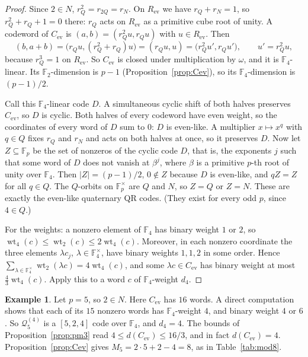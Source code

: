 \documentclass[12pt,letterpaper]{article}
\theoremstyle{definition}
\newtheorem{example}[theorem]{Example}
\theoremstyle{remark}
\numberwithin{equation}{section}
\newcommand{\F}{\mathbb{F}}
\newcommand{\Fp}{\mathbb{F}_p}
\newcommand{\wt}{\operatorname{wt}}
\newcommand{\Cev}{C_{\mathrm{ev}}}
\begin{document}
\begin{proof}
Since $2\in N$, $r_Q^2=r_{2Q}=r_N$. On $R_{\mathrm{ev}}$ we have $r_Q+r_N=1$, so
$r_Q^2+r_Q+1=0$ there: $r_Q$ acts on $R_{\mathrm{ev}}$ as a primitive cube root of
unity. A codeword of $\Cev$ is $(a,b)=(r_Q^2u,r_Qu)$ with $u\in R_{\mathrm{ev}}$.
Then
\[
(b,a+b)=\big(r_Qu,(r_Q^2+r_Q)u\big)=(r_Qu,u)=\big(r_Q^2u',r_Qu'\big),\qquad
u'=r_Q^2u,
\]
because $r_Q^3=1$ on $R_{\mathrm{ev}}$. So $\Cev$ is closed under multiplication by
$\omega$, and it is $\F_4$-linear. Its $\F_2$-dimension is $p-1$
(Proposition~\ref{prop:Cev}), so its $\F_4$-dimension is $(p-1)/2$.

Call this $\F_4$-linear code $D$. A simultaneous cyclic shift of both halves
preserves $\Cev$, so $D$ is cyclic. Both halves of every codeword have even weight,
so the coordinates of every word of $D$ sum to $0$: $D$ is even-like. A multiplier
$x\mapsto x^q$ with $q\in Q$ fixes $r_Q$ and $r_N$ and acts on both halves at once,
so it preserves $D$. Now let $Z\subseteq\Fp$ be the set of nonzeros of the cyclic
code $D$, that is, the exponents $j$ such that some word of $D$ does not vanish at
$\beta^j$, where $\beta$ is a primitive $p$-th root of unity over $\F_4$. Then
$|Z|=(p-1)/2$, $0\notin Z$ because $D$ is even-like, and $qZ=Z$ for all $q\in Q$.
The $Q$-orbits on $\Fp^\times$ are $Q$ and $N$, so $Z=Q$ or $Z=N$. These are exactly
the even-like quaternary QR codes. (They exist for every odd $p$, since $4\in Q$.)

For the weights: a nonzero element of $\F_4$ has binary weight $1$ or $2$, so
$\wt_4(c)\le\wt_2(c)\le2\wt_4(c)$. Moreover, in each nonzero coordinate the three
elements $\lambda c_j$, $\lambda\in\F_4^\times$, have binary weights $1,1,2$ in some
order. Hence $\sum_{\lambda\in\F_4^\times}\wt_2(\lambda c)=4\wt_4(c)$, and some
$\lambda c\in\Cev$ has binary weight at most $\frac43\wt_4(c)$. Apply this to a word
$c$ of $\F_4$-weight $d_4$.
\end{proof}

\begin{example}\label{ex:pm3p5}
Let $p=5$, so $2\in N$. Here $\Cev$ has $16$ words. A direct computation shows
that each of its $15$ nonzero words has $\F_4$-weight $4$, and binary weight $4$
or $6$. So $\mathcal Q^{(4)}_5$ is a $[5,2,4]$ code over $\F_4$, and $d_4=4$. The
bounds of Proposition~\ref{prop:pm3} read $4\le d(\Cev)\le 16/3$, and in fact
$d(\Cev)=4$. Proposition~\ref{prop:Cev} gives $M_5=2\cdot5+2-4=8$, as in
Table~\ref{tab:mod8}.
\end{example}
\end{document}
